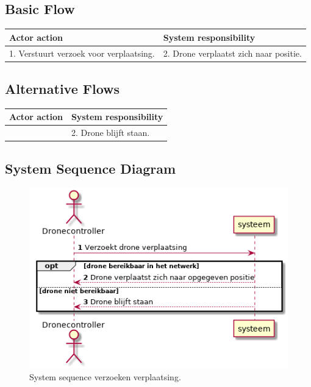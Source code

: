 \documentclass[a4paper, 11pt, oneside]{report}
\begin{document}
\subsection{Basic Flow }


\begin{table}[H]
	\centering
	\begin{tabular}{|l|l|}
		\hline
		\rowcolor[HTML]{C0C0C0} 
		Actor action  & System responsibility   \\ \hline
		1. Verstuurt verzoek voor verplaatsing.  & 2. Drone verplaatst zich naar positie. \\ \hline
												 	\end{tabular}
\end{table}

\subsection{Alternative Flows}


\begin{table}[H]
	\centering
	\begin{tabular}{|l|l|}
		\hline
		\rowcolor[HTML]{C0C0C0} 
		Actor action  & System responsibility   \\ \hline
	    & 2. Drone blijft staan. \\ \hline
	\end{tabular}
\end{table}


\subsection{System Sequence Diagram }
\label{Usecase:verzoekverplaatsing:systemsequence}

\begin{figure}[H]
	\begin{center}\includegraphics[height=.3\textheight]{UML/out/usecase/sequence/verzoekendroneverplaatsing/verzoekendroneverplaatsing.png}\end{center}
	\caption{System sequence verzoeken verplaatsing.}
	\label{fig:verzoekverplaatsing:systemsequence}
\end{figure}
\end{document}
